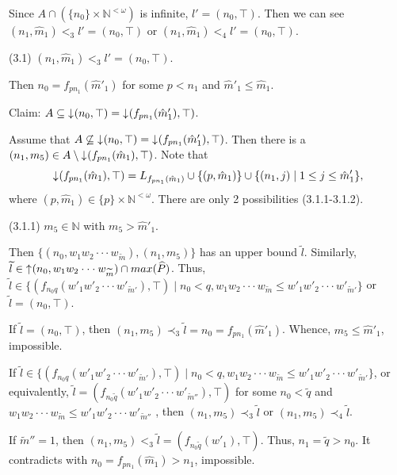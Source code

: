 \documentclass[preprint,12pt]{elsarticle}
\numberwithin{equation}{section}
\newcommand{\dn}{\mathord{\downarrow}\hspace{0.05em}}
\newcommand{\up}{\mathord{\uparrow}\hspace{0.05em}}
\begin{document}
Since $A\cap (\{n_{0}\}\times \mathbb{N}^{<\omega})$ is infinite, $l'=(n_{0},\top)$. Then we can see $(n_{1},\hat{m}_{1})<_{3}l'=(n_{0},\top)$ or $(n_{1},\hat{m}_{1})<_{4}l'=(n_{0},\top)$.









(3.1) $(n_{1},\hat{m}_{1})<_{3}l'=(n_{0},\top)$.

Then $n_{0}=f_{pn_{1}}(\hat{m}'_{1})$ for some $p<n_{1}$ and $\hat{m}'_{1}\leq\hat{m}_{1}$.

Claim: $A\subseteq \dn (n_{0},\top)=\dn(f_{pn_{1}}(\hat{m}'_{1}),\top)$.

Assume that $A\not\subseteq \dn(n_{0},\top)=\dn(f_{pn_{1}}(\hat{m}'_{1}),\top)$. Then there is a $(n_{1},m_{5})\in A\setminus\dn(f_{pn_{1}}(\hat{m}_{1}),\top)$. Note that $$\dn(f_{pn_{1}}(\hat{m}_{1}),\top)=L_{f_{pn_{1}}(\hat{m}_{1})}\cup\{(p,\hat{m}_{1})\}\cup\{(n_{1},j)\mid 1\leq j\leq \hat{m}'_{1}\},$$ where $(p,\hat{m}_{1})\in\{p\}\times\mathbb{N}^{<\omega}$. There are only 2 possibilities (3.1.1-3.1.2).

(3.1.1) $m_{5}\in\mathbb{N}$ with $m_{5}>\hat{m}'_{1}$.

 Then $\{(n_{0},w_{1}w_{2}\cdot\cdot\cdot w_{\widetilde{m}}),(n_{1},m_{5})\}$ has an upper bound $\widetilde{l}$. Similarly, $\widetilde{l}\in\up(n_{0},w_{1}w_{2}\cdot\cdot\cdot w_{\widetilde{m}})\cap max(\widehat{P})$. Thus,  $\widetilde{l}\in\{(f_{n_{0}q}(w'_{1}w'_{2}\cdot\cdot\cdot w'_{\widetilde{m}'}),\top)\mid n_{0}<q, w_{1}w_{2}\cdot\cdot\cdot w_{\widetilde{m}}\leq w'_{1}w'_{2}\cdot\cdot\cdot w'_{\widetilde{m}'}\}$ or $\widetilde{l}=(n_{0},\top)$.

If $\widetilde{l}=(n_{0},\top)$, then $(n_{1},m_{5})\prec_{3}\widetilde{l}=n_{0}=f_{pn_{1}}(\hat{m}'_{1})$. Whence, $m_{5}\leq\hat{m}'_{1}$, impossible.

If $\widetilde{l}\in\{(f_{n_{0}q}(w'_{1}w'_{2}\cdot\cdot\cdot w'_{\widetilde{m}'}),\top)\mid n_{0}<q, w_{1}w_{2}\cdot\cdot\cdot w_{\widetilde{m}}\leq w'_{1}w'_{2}\cdot\cdot\cdot w'_{\widetilde{m}'}\}$, or equivalently, $\widetilde{l}=(f_{n_{0}\widetilde{q}}(w'_{1}w'_{2}\cdot\cdot\cdot w'_{\widetilde{m}''}),\top)$ for some $n_{0}<\widetilde{q}$ and $w_{1}w_{2}\cdot\cdot\cdot w_{\widetilde{m}}\leq w'_{1}w'_{2}\cdot\cdot\cdot w'_{\widetilde{m}''}$ , then $(n_{1},m_{5})\prec_{3}\widetilde{l}$ or $(n_{1},m_{5})\prec_{4}\widetilde{l}$.

If $\widetilde{m}''=1$, then $(n_{1},m_{5})<_{3}\widetilde{l}=(f_{n_{0}\widetilde{q}}(w'_{1}),\top)$. Thus, $n_{1}=\widetilde{q}>n_{0}$. It contradicts with $n_{0}=f_{pn_{1}}(\hat{m}_{1})>n_{1}$, impossible.
\end{document}
